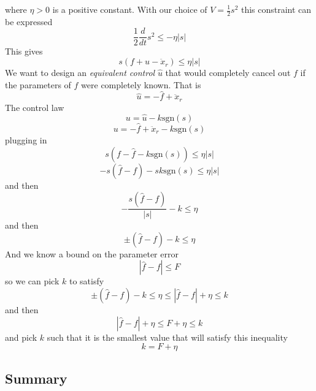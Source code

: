 where $\eta>0$ is a positive constant.
With our choice of $V=\frac{1}{2}s^{2}$ this constraint can be expressed
\begin{equation*}
  \frac{1}{2}\frac{d}{dt}s^{2}\leq-\eta|s|
\end{equation*}
This gives
\begin{equation*}
  s(f+u-\ddot{x}_{r})\leq\eta|s|
\end{equation*}
We want to design an \textit{equivalent control} $\hat{u}$ that would completely cancel out $f$ if the parameters of $f$ were completely known.
That is
\begin{equation*}
  \hat{u}=-\hat{f}+\ddot{x}_{r}
\end{equation*}
The control law
\begin{equation*}
  u=\hat{u}-k\text{sgn}(s)
\end{equation*}
\begin{equation*}
  u=-\hat{f}+\ddot{x}_{r}-k\text{sgn}(s)
\end{equation*}
plugging in
\begin{equation*}
  s(f-\hat{f}-k\text{sgn}(s))\leq\eta|s|
\end{equation*}
\begin{equation*}
  -s(\hat{f}-f)-sk\text{sgn}(s)\leq\eta|s|
\end{equation*}
and then
\begin{equation*}
  -\frac{s(\hat{f}-f)}{|s|}-k\leq\eta
\end{equation*}
and then
\begin{equation*}
  \pm(\hat{f}-f)-k\leq\eta
\end{equation*}
And we know a bound on the parameter error
\begin{equation*}
  |\hat{f}-f|\leq F
\end{equation*}
so we can pick $k$ to satisfy
\begin{equation*}
  \pm(\hat{f}-f)-k\leq\eta\leq|\hat{f}-f|+\eta\leq k
\end{equation*}
and then
\begin{equation*}
  |\hat{f}-f|+\eta\leq F+\eta\leq k
\end{equation*}
and pick $k$ such that it is the smallest value that will satisfy this inequality
\begin{equation*}
k=F+\eta
\end{equation*}

\subsection{Summary}

